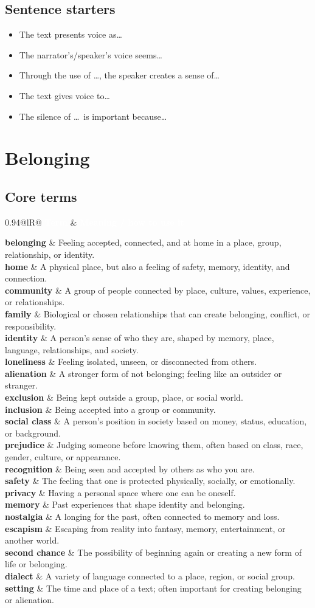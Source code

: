 \documentclass[10pt,a4paper]{article}
\makeatletter
\newcommand{\termrow}[2]{\textbf{#1} & #2 \\}
\newcommand{\termrowshaded}[2]{\rowcolor{rowgrey}\textbf{#1} & #2 \\}
\newcommand{\termtable}[1]{%
		\begin{center}
		\begin{tabularx}{0.94\textwidth}{@{}lR@{}}
		\toprule
		\rowcolor{frbgreen}\textcolor{white}{\textbf{Term}} & \textcolor{white}{\textbf{Meaning / how to use it}} \\
		\midrule
		#1
		\bottomrule
		\end{tabularx}
		\end{center}%
	}
\makeatother
\begin{document}
\subsection*{Sentence starters}

\begin{itemize}
	\item The text presents voice as\ldots
	\item The narrator's/speaker's voice seems\ldots
	\item Through the use of \ldots, the speaker creates a sense of\ldots
	\item The text gives voice to\ldots
	\item The silence of \ldots\ is important because\ldots
\end{itemize}


\section{Belonging}

\subsection*{Core terms}

\termtable{
\termrow{belonging}{Feeling accepted, connected, and at home in a place, group, relationship, or identity.}
\termrowshaded{home}{A physical place, but also a feeling of safety, memory, identity, and connection.}
\termrow{community}{A group of people connected by place, culture, values, experience, or relationships.}
\termrowshaded{family}{Biological or chosen relationships that can create belonging, conflict, or responsibility.}
\termrow{identity}{A person's sense of who they are, shaped by memory, place, language, relationships, and society.}
\termrowshaded{loneliness}{Feeling isolated, unseen, or disconnected from others.}
\termrow{alienation}{A stronger form of not belonging; feeling like an outsider or stranger.}
\termrowshaded{exclusion}{Being kept outside a group, place, or social world.}
\termrow{inclusion}{Being accepted into a group or community.}
\termrowshaded{social class}{A person's position in society based on money, status, education, or background.}
\termrow{prejudice}{Judging someone before knowing them, often based on class, race, gender, culture, or appearance.}
\termrowshaded{recognition}{Being seen and accepted by others as who you are.}
\termrow{safety}{The feeling that one is protected physically, socially, or emotionally.}
\termrowshaded{privacy}{Having a personal space where one can be oneself.}
\termrow{memory}{Past experiences that shape identity and belonging.}
\termrowshaded{nostalgia}{A longing for the past, often connected to memory and loss.}
\termrow{escapism}{Escaping from reality into fantasy, memory, entertainment, or another world.}
\termrowshaded{second chance}{The possibility of beginning again or creating a new form of life or belonging.}
\termrow{dialect}{A variety of language connected to a place, region, or social group.}
\termrowshaded{setting}{The time and place of a text; often important for creating belonging or alienation.}
}
\end{document}
